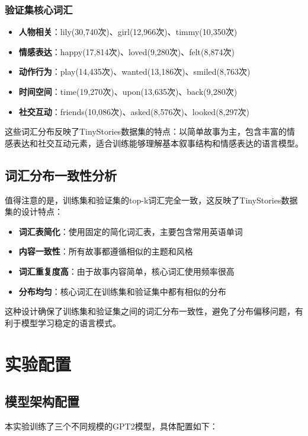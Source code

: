 \documentclass{article}
\begin{document}
\subsubsection{验证集核心词汇}
\begin{itemize}
    \item \textbf{人物相关}：lily(30,740次)、girl(12,966次)、timmy(10,350次)
    \item \textbf{情感表达}：happy(17,814次)、loved(9,280次)、felt(8,874次)
    \item \textbf{动作行为}：play(14,435次)、wanted(13,186次)、smiled(8,763次)
    \item \textbf{时间空间}：time(19,270次)、upon(13,635次)、back(9,280次)
    \item \textbf{社交互动}：friends(10,086次)、asked(8,576次)、looked(8,297次)
\end{itemize}

这些词汇分布反映了TinyStories数据集的特点：以简单故事为主，包含丰富的情感表达和社交互动元素，适合训练能够理解基本叙事结构和情感表达的语言模型。

\subsection{词汇分布一致性分析}
值得注意的是，训练集和验证集的top-k词汇完全一致，这反映了TinyStories数据集的设计特点：

\begin{itemize}
    \item \textbf{词汇表简化}：使用固定的简化词汇表，主要包含常用英语单词
    \item \textbf{内容一致性}：所有故事都遵循相似的主题和风格
    \item \textbf{词汇重复度高}：由于故事内容简单，核心词汇使用频率很高
    \item \textbf{分布均匀}：核心词汇在训练集和验证集中都有相似的分布
\end{itemize}

这种设计确保了训练集和验证集之间的词汇分布一致性，避免了分布偏移问题，有利于模型学习稳定的语言模式。

\section{实验配置}

\subsection{模型架构配置}
本实验训练了三个不同规模的GPT2模型，具体配置如下：
\end{document}
